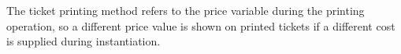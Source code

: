 The ticket printing method refers to the price variable during the
printing operation, so a different price value is shown on printed
tickets if a different cost is supplied during instantiation.
